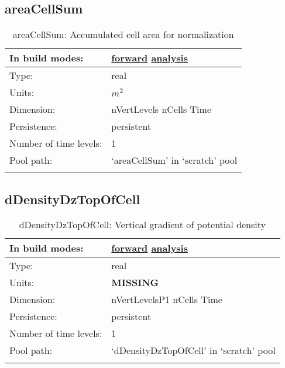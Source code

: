 \subsection[areaCellSum]{areaCellSum}
\label{subsec:var_sec_scratch_areaCellSum}
\begin{center}
\begin{longtable}{| p{2.0in} | p{4.0in} |}
        \hline 
        In build modes: & \hyperref[subsec:forward_var_tab_scratch]{forward} \hyperref[subsec:analysis_var_tab_scratch]{analysis} \\
        \hline 
        Type: & real \\
        \hline 
        Units: & $m^{2}$ \\
        \hline 
        Dimension: & nVertLevels nCells Time \\
        \hline 
        Persistence: & persistent \\
        \hline 
        Number of time levels: & 1 \\
        \hline 
            Pool path: & `areaCellSum' in `scratch' pool \\
		 \hline 
    \caption{areaCellSum: Accumulated cell area for normalization}
\end{longtable}
\end{center}
\subsection[dDensityDzTopOfCell]{dDensityDzTopOfCell}
\label{subsec:var_sec_scratch_dDensityDzTopOfCell}
\begin{center}
\begin{longtable}{| p{2.0in} | p{4.0in} |}
        \hline 
        In build modes: & \hyperref[subsec:forward_var_tab_scratch]{forward} \hyperref[subsec:analysis_var_tab_scratch]{analysis} \\
        \hline 
        Type: & real \\
        \hline 
        Units: & {\bf \color{red} MISSING} \\
        \hline 
        Dimension: & nVertLevelsP1 nCells Time \\
        \hline 
        Persistence: & persistent \\
        \hline 
        Number of time levels: & 1 \\
        \hline 
            Pool path: & `dDensityDzTopOfCell' in `scratch' pool \\
		 \hline 
    \caption{dDensityDzTopOfCell: Vertical gradient of potential density}
\end{longtable}
\end{center}
